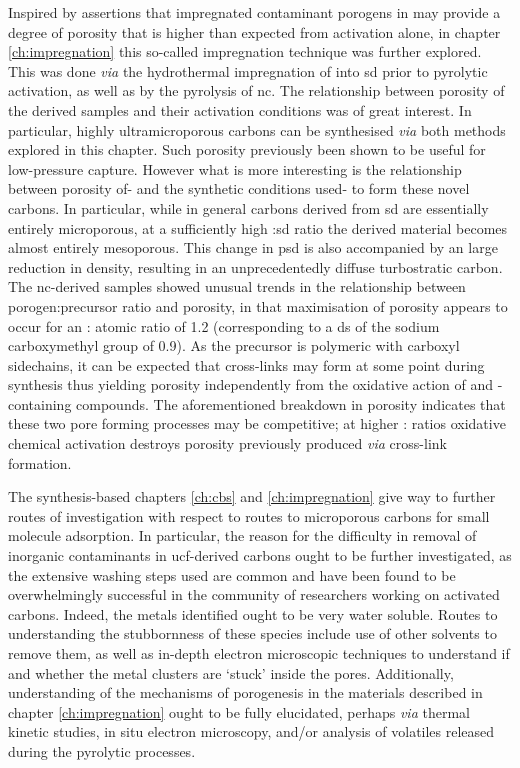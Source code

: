 Inspired by assertions that impregnated contaminant \glspl{porogen} in  may provide a degree of porosity that is higher than expected from  activation alone, in chapter \ref{ch:impregnation} this so-called impregnation technique was further explored. This was done \textit{via} the hydrothermal impregnation of  into \acrfull{sd} prior to pyrolytic \gls{activation}, as well as by the pyrolysis of \acrfull{nc}. The relationship between porosity of the derived samples and their activation conditions was of great interest. In particular, highly ultramicroporous carbons can be synthesised \textit{via} both methods explored in this chapter. Such porosity previously been shown to be useful for low-pressure  capture. However what is more interesting is the relationship between porosity of- and the synthetic conditions used- to form these novel carbons. In particular, while in general carbons derived from \acrshort{sd} are essentially entirely microporous, at a sufficiently high :\acrshort{sd} ratio the derived material becomes almost entirely mesoporous. This change in \acrshort{psd} is also accompanied by an large reduction in density, resulting in an unprecedentedly diffuse \gls{turbostratic carbon}. The \acrshort{nc}-derived samples showed unusual trends in the relationship between \gls{porogen}:precursor ratio and porosity, in that maximisation of porosity appears to occur for an : atomic ratio of 1.2 (corresponding to a \acrfull{ds} of the sodium carboxymethyl group of 0.9). As the precursor is polymeric with carboxyl sidechains, it can be expected that cross-links may form at some point during synthesis thus yielding porosity independently from the oxidative action of  and -containing compounds. The aforementioned breakdown in porosity indicates that these two pore forming processes may be competitive; at higher : ratios oxidative chemical activation destroys porosity previously produced \textit{via} cross-link formation.

The synthesis-based chapters \ref{ch:cbs} and \ref{ch:impregnation} give way to further routes of investigation with respect to routes to microporous carbons for small molecule adsorption. In particular, the reason for the difficulty in removal of inorganic contaminants in \gls{ucf}-derived carbons ought to be further investigated, as the extensive washing steps used are common and have been found to be overwhelmingly successful in the community of researchers working on \glspl{activated carbon}. Indeed, the metals identified ought to be very water soluble. Routes to understanding the stubbornness of these species include use of other solvents to remove them, as well as in-depth electron microscopic techniques to understand if and whether the metal clusters are `stuck' inside the pores. Additionally, understanding of the mechanisms of porogenesis in the materials described in chapter \ref{ch:impregnation} ought to be fully elucidated, perhaps \textit{via} thermal kinetic studies, in situ electron microscopy, and/or analysis of volatiles released during the pyrolytic processes. 

